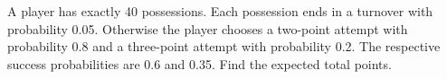 A player has exactly 40 possessions. Each possession ends in a turnover with probability 0.05. Otherwise the player chooses a two-point attempt with probability 0.8 and a three-point attempt with probability 0.2. The respective success probabilities are 0.6 and 0.35. Find the expected total points.
